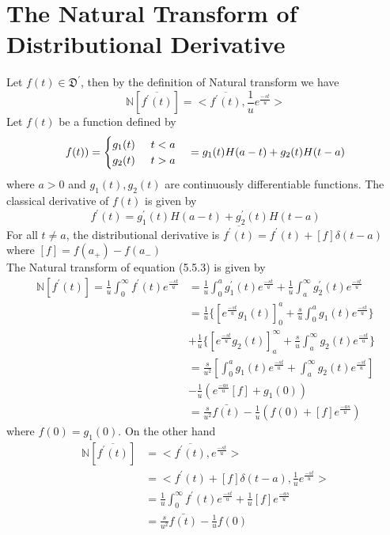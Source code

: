 \section{The Natural Transform of Distributional Derivative}
Let $ f(t)\in \mathfrak{D}^{\prime} $, then by the definition of Natural transform we have 
\begin{equation}
\mathbb{N}[\overline{f^{\prime}(t)}]=<\overline{f^{\prime}(t)},\frac{1}{u}e^{\frac{-st}{u}}>
\end{equation}
Let $ f(t) $ be a function defined by 
\begin{align}
 f(t))= \begin{cases}
g_{1}(t)\hspace{0.5cm}  t<a \\
g_{2}(t)\hspace{0.5cm} t>a
  \end{cases}
  =g_{1}(t)H(a-t)+g_{2}(t)H(t-a)
 \end{align}
where $ a>0 $ and $g_{1}(t), g_{2}(t)$ are continuously differentiable functions. The classical derivative of $f(t)$ is given by
\begin{equation}
f^{\prime}(t)=g_{1}^{\prime}(t)H(a-t)+g_{2}^{\prime}(t)H(t-a)
\end{equation}
For all $ t\neq a $, the distributional derivative is 
$\overline{f^{\prime}(t)}=f^{\prime}(t)+[f]\delta(t-a)$\\
where $[f]=f(a_{+})-f(a_{-})$\\
The Natural transform of equation (5.5.3) is given by
\begin{align*}
\mathbb{N}[f^{\prime}(t)]=\frac{1}{u}\int_{0}^{\infty}f^{\prime}(t)e^{\frac{-st}{u}}&=\frac{1}{u}\int_{0}^{a}g_{1}^{\prime}(t)e^{\frac{-st}{u}}+\frac{1}{u}\int_{a}^{\infty}g_{2}^{\prime}(t)e^{\frac{-st}{u}}\\
&=\frac{1}{u}\lbrace[e^{\frac{-st}{u}}g_{1}(t)]_{0}^{a}+\frac{s}{u}\int_{0}^{a}g_{1}(t)e^{\frac{-st}{u}}\rbrace\\
&+\frac{1}{u}\lbrace[e^{\frac{-st}{u}}g_{2}(t)]_{a}^{\infty}+\frac{s}{u}\int_{a}^{\infty}g_{2}(t)e^{\frac{-st}{u}}\rbrace\\
&=\frac{s}{u^{2}}[\int_{0}^{a}g_{1}(t)e^{\frac{-st}{u}}+\int_{a}^{\infty}g_{2}(t)e^{\frac{-st}{u}}]\\
&-\frac{1}{u}(e^{\frac{-as}{u}}[f]+g_{1}(0))\\
&=\frac{s}{u^{2}}\bar{f(t)}-\frac{1}{u}(f(0)+[f]e^{\frac{-as}{u}})
\end{align*}
where $f(0)=g_{1}(0)$. On the other hand 
\begin{align*}
\mathbb{N}[\overline{f^{\prime}(t)}]&=<\overline{f^{\prime}(t)},e^{\frac{-st}{u}}>\\
&=<f^{\prime}(t)+[f]\delta(t-a),\frac{1}{u}e^{\frac{-st}{u}}>\\
&=\frac{1}{u}\int_{0}^{\infty}f^{\prime}(t)e^{\frac{-st}{u}}+\frac{1}{u}[f]e^{\frac{-as}{u}}\\
&=\frac{s}{u^{2}}\bar{f(t)}-\frac{1}{u}f(0)
\end{align*}
